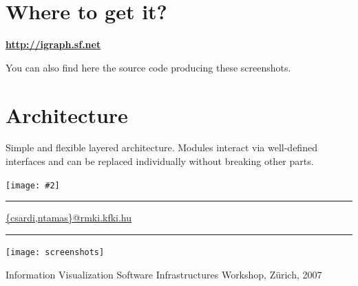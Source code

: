 \documentclass[a3]{sciposter}
\newcommand{\figfigure}[2]{%
  \begin{psfrags}
  
  \texttt{[image: \#2]}
  \end{psfrags}
}
\begin{document}
\begin{multicols}{3}
\section{Where to get it?}
\centerline{\bf \url{http://igraph.sf.net}}

You can also find here the source code producing these screenshots.

\vfill\columnbreak
\section{Architecture}

Simple and flexible layered architecture.
Modules interact via well-defined interfaces and 
can be replaced individually without breaking other parts.

\begin{center}
\figfigure{\columnwidth}{arch}
\end{center}


\hrule
\vfill
\url{{csardi,ntamas}@rmki.kfki.hu}
\end{multicols}

\vfill
\hrule
\vfill

\centerline{\texttt{[image: screenshots]}}
\vspace*{-0.3cm}
\centerline{\small Information Visualization Software Infrastructures Workshop, Z\"urich, 2007}
\vfill
\end{document}
